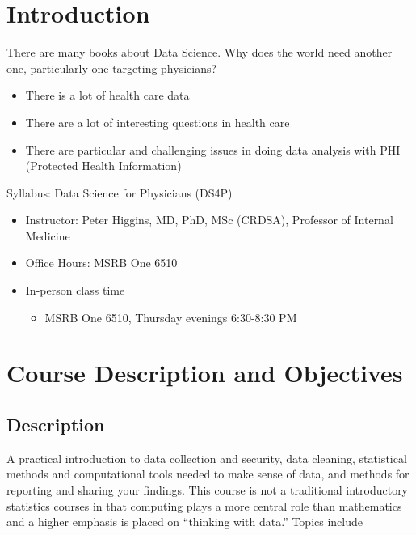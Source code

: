 \documentclass[
]{book}
\providecommand{\tightlist}{%
  \setlength{\itemsep}{0pt}\setlength{\parskip}{0pt}}
\begin{document}
\hypertarget{intro}{%
\section{Introduction}\label{intro}}

There are many books about Data Science.
Why does the world need another one, particularly one targeting physicians?

\begin{itemize}
\tightlist
\item
  There is a lot of health care data
\item
  There are a lot of interesting questions in health care
\item
  There are particular and challenging issues in doing data analysis with PHI (Protected Health Information)
\end{itemize}

Syllabus: Data Science for Physicians (DS4P)

\begin{itemize}
\tightlist
\item
  Instructor: Peter Higgins, MD, PhD, MSc (CRDSA), Professor of Internal Medicine
\item
  Office Hours: MSRB One 6510
\item
  In-person class time

  \begin{itemize}
  \tightlist
  \item
    MSRB One 6510, Thursday evenings 6:30-8:30 PM
  \end{itemize}
\end{itemize}

\hypertarget{course-description-and-objectives}{%
\section{Course Description and Objectives}\label{course-description-and-objectives}}

\hypertarget{description}{%
\subsection{Description}\label{description}}

A practical introduction to data collection and security, data cleaning, statistical methods and computational tools needed to make sense of data, and methods for reporting and sharing your findings. This course is not a traditional introductory statistics courses in that computing plays a more central role than mathematics and a higher emphasis is placed on ``thinking with data.'' Topics include
\end{document}
